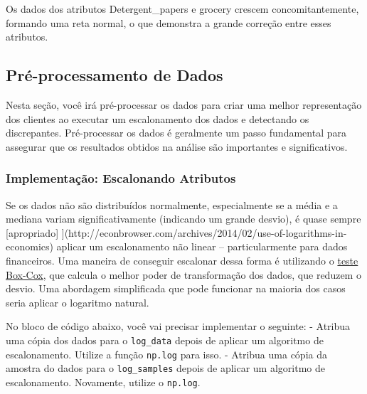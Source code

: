 \documentclass[11pt]{article}
\begin{document}
Os dados dos atributos Detergent\_papers e grocery crescem
concomitantemente, formando uma reta normal, o que demonstra a grande
correção entre esses atributos.

    \subsection{Pré-processamento de
Dados}\label{pruxe9-processamento-de-dados}

Nesta seção, você irá pré-processar os dados para criar uma melhor
representação dos clientes ao executar um escalonamento dos dados e
detectando os discrepantes. Pré-processar os dados é geralmente um passo
fundamental para assegurar que os resultados obtidos na análise são
importantes e significativos.

    \subsubsection{Implementação: Escalonando
Atributos}\label{implementauxe7uxe3o-escalonando-atributos}

Se os dados não são distribuídos normalmente, especialmente se a média e
a mediana variam significativamente (indicando um grande desvio), é
quase sempre {[}apropriado{]}
{]}(http://econbrowser.com/archives/2014/02/use-of-logarithms-in-economics)
aplicar um escalonamento não linear -- particularmente para dados
financeiros. Uma maneira de conseguir escalonar dessa forma é utilizando
o
\href{http://scipy.github.io/devdocs/generated/scipy.stats.boxcox.html}{teste
Box-Cox}, que calcula o melhor poder de transformação dos dados, que
reduzem o desvio. Uma abordagem simplificada que pode funcionar na
maioria dos casos seria aplicar o logaritmo natural.

No bloco de código abaixo, você vai precisar implementar o seguinte: -
Atribua uma cópia dos dados para o \texttt{log\_data} depois de aplicar
um algoritmo de escalonamento. Utilize a função \texttt{np.log} para
isso. - Atribua uma cópia da amostra do dados para o
\texttt{log\_samples} depois de aplicar um algoritmo de escalonamento.
Novamente, utilize o \texttt{np.log}.
\end{document}
